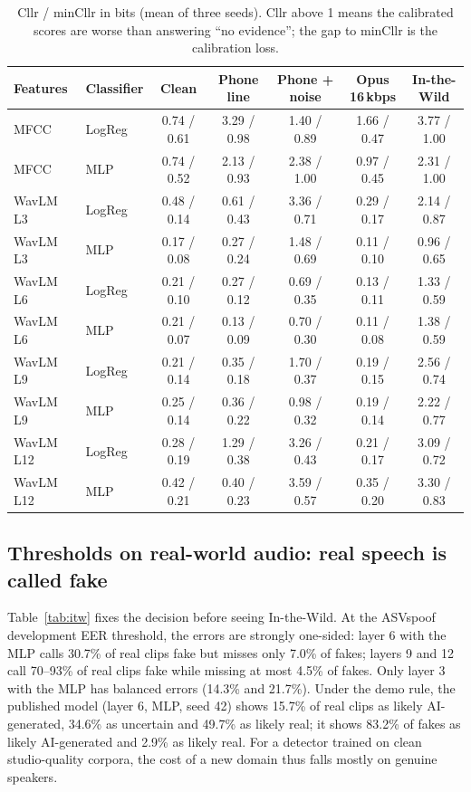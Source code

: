 \documentclass[10pt,a4paper]{article}
\begin{document}
\begin{table}[t]
\centering
\caption{Cllr / minCllr in bits (mean of three seeds). Cllr above 1 means the calibrated scores are worse than
answering ``no evidence''; the gap to minCllr is the calibration loss.}
\label{tab:cllr}
\small
\begin{tabular}{llccccc}
\toprule
Features & Classifier & Clean & Phone line & Phone + noise & Opus 16\,kbps & In-the-Wild \\
\midrule
MFCC & LogReg & 0.74 / 0.61 & 3.29 / 0.98 & 1.40 / 0.89 & 1.66 / 0.47 & 3.77 / 1.00 \\
MFCC & MLP & 0.74 / 0.52 & 2.13 / 0.93 & 2.38 / 1.00 & 0.97 / 0.45 & 2.31 / 1.00 \\
\midrule
WavLM L3 & LogReg & 0.48 / 0.14 & 0.61 / 0.43 & 3.36 / 0.71 & 0.29 / 0.17 & 2.14 / 0.87 \\
WavLM L3 & MLP & 0.17 / 0.08 & 0.27 / 0.24 & 1.48 / 0.69 & 0.11 / 0.10 & 0.96 / 0.65 \\
WavLM L6 & LogReg & 0.21 / 0.10 & 0.27 / 0.12 & 0.69 / 0.35 & 0.13 / 0.11 & 1.33 / 0.59 \\
WavLM L6 & MLP & 0.21 / 0.07 & 0.13 / 0.09 & 0.70 / 0.30 & 0.11 / 0.08 & 1.38 / 0.59 \\
WavLM L9 & LogReg & 0.21 / 0.14 & 0.35 / 0.18 & 1.70 / 0.37 & 0.19 / 0.15 & 2.56 / 0.74 \\
WavLM L9 & MLP & 0.25 / 0.14 & 0.36 / 0.22 & 0.98 / 0.32 & 0.19 / 0.14 & 2.22 / 0.77 \\
WavLM L12 & LogReg & 0.28 / 0.19 & 1.29 / 0.38 & 3.26 / 0.43 & 0.21 / 0.17 & 3.09 / 0.72 \\
WavLM L12 & MLP & 0.42 / 0.21 & 0.40 / 0.23 & 3.59 / 0.57 & 0.35 / 0.20 & 3.30 / 0.83 \\
\bottomrule
\end{tabular}
\end{table}

\subsection{Thresholds on real-world audio: real speech is called fake}
Table~\ref{tab:itw} fixes the decision before seeing In-the-Wild. At the ASVspoof development EER threshold, the
errors are strongly one-sided: layer 6 with the MLP calls 30.7\% of real clips fake but misses only 7.0\% of fakes;
layers 9 and 12 call 70--93\% of real clips fake while missing at most 4.5\% of fakes. Only layer 3 with the MLP has
balanced errors (14.3\% and 21.7\%). Under the demo rule, the published model (layer 6, MLP, seed 42) shows 15.7\%
of real clips as likely AI-generated, 34.6\% as uncertain and 49.7\% as likely real; it shows 83.2\% of fakes as
likely AI-generated and 2.9\% as likely real. For a detector trained on clean studio-quality corpora, the cost of a
new domain thus falls mostly on genuine speakers.
\end{document}
